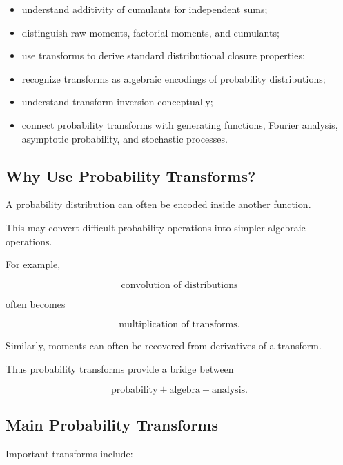 {\begin{itemize}
    \item understand additivity of cumulants for independent sums;
    \item distinguish raw moments, factorial moments, and cumulants;
    \item use transforms to derive standard distributional closure
          properties;
    \item recognize transforms as algebraic encodings of probability
          distributions;
    \item understand transform inversion conceptually;
    \item connect probability transforms with generating functions,
          Fourier analysis, asymptotic probability, and stochastic
          processes.
\end{itemize}
}

\subsection{Why Use Probability Transforms?}
\label{subsec:why-probability-transforms}

A probability distribution can often be encoded inside another
function.

This may convert difficult probability operations into simpler
algebraic operations.

For example,

\[
\boxed{
\text{convolution of distributions}
}
\]

often becomes

\[
\boxed{
\text{multiplication of transforms}.
}
\]

Similarly, moments can often be recovered from derivatives of a
transform.

Thus probability transforms provide a bridge between

\[
\boxed{
\text{probability}
+
\text{algebra}
+
\text{analysis}.
}
\]

\subsection{Main Probability Transforms}
\label{subsec:main-probability-transforms}

Important transforms include:

